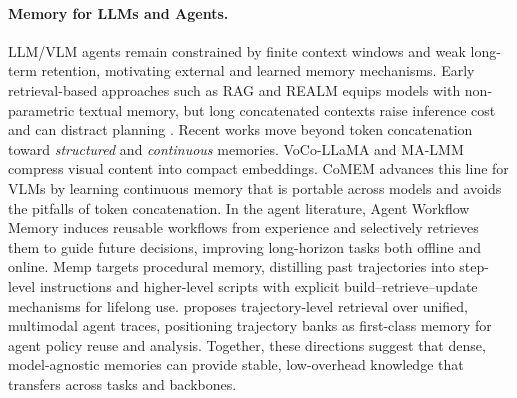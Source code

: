 \documentclass{article} %
\begin{document}
\paragraph{Memory for LLMs and Agents.} 
LLM/VLM agents remain constrained by finite context windows and weak long-term retention, motivating external and learned memory mechanisms. Early retrieval-based approaches such as RAG \citep{RAG2020} and REALM \citep{realm2020} equips models with non-parametric textual memory, but long concatenated contexts raise inference cost and can distract planning \citep{RAGsurvey2024}. 
Recent works move beyond token concatenation toward \emph{structured} and \emph{continuous} memories. 
VoCo-LLaMA \citep{VoCo-LLaMA} and MA-LMM \citep{he2024malmm} compress visual content into compact embeddings. CoMEM \citep{wu2025} advances this line for VLMs by learning continuous memory that is portable across models and avoids the pitfalls of token concatenation. 
In the agent literature, Agent Workflow Memory \citep{wang2025AWM} induces reusable workflows from experience and selectively retrieves them to guide future decisions, improving long-horizon tasks both offline and online. Memp \citep{fang2025memp} targets procedural memory, distilling past trajectories into step-level instructions and higher-level scripts with explicit build–retrieve–update mechanisms for lifelong use. \citep{zhang2025universalretrievalmultimodaltrajectory} proposes trajectory-level retrieval over unified, multimodal agent traces, positioning trajectory banks as first-class memory for agent policy reuse and analysis. Together, these directions suggest that dense, model-agnostic memories can provide stable, low-overhead knowledge that transfers across tasks and backbones.

\end{document}
